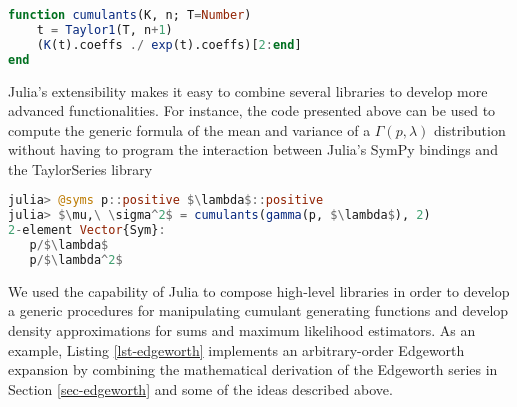 \newpage
\begin{lstlisting}[language=Julia, mathescape, escapechar=\%, basicstyle=\small]
function cumulants(K, n; T=Number)
    t = Taylor1(T, n+1)
    (K(t).coeffs ./ exp(t).coeffs)[2:end]
end
\end{lstlisting}
Julia's extensibility makes it easy to combine several libraries to develop more advanced functionalities. For instance, the code presented above can be used to compute the generic formula of the mean and variance of a $\Gamma(p, \lambda)$ distribution without having to program the interaction between Julia's SymPy bindings and the TaylorSeries library
\begin{lstlisting}[language=Julia, mathescape, escapechar=\%]
julia> @syms p::positive $\lambda$::positive
julia> $\mu,\ \sigma^2$ = cumulants(gamma(p, $\lambda$), 2)
2-element Vector{Sym}:
   p/$\lambda$
   p/$\lambda^2$
\end{lstlisting}
We used the capability of Julia to compose high-level libraries in order to develop a generic procedures for manipulating cumulant generating functions and develop density approximations for sums and maximum likelihood estimators. As an example, Listing \ref{lst-edgeworth} implements an arbitrary-order Edgeworth expansion by combining the mathematical derivation of the Edgeworth series in Section \ref{sec-edgeworth} and some of the ideas described above.


